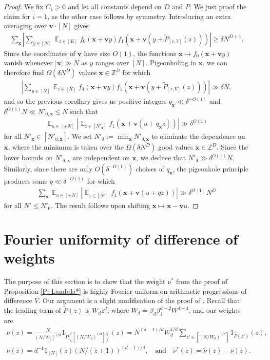 \documentclass[11pt]{amsart}
\theoremstyle{definition}
\DeclareMathOperator*{\E}{\mathbb{E}}
\newcommand{\Z}{{\mathbb Z}}
\newcommand{\bv}{{\textbf{v}}}
\newcommand{\bx}{{\textbf{x}}}
\newcommand{\abs}[1]{\mathopen{}\left| #1\mathclose{}\right|}
\begin{document}
\begin{proof} We fix $C_1>0$ and let all constants depend on $D$ and $P$. We just proof the claim for $i=1$, as the other case follows by symmetry.
    Introducing an extra averaging over $\bv\cdot[N]$ gives
    \begin{align*}
        \sum_\bx\abs{\sum_{y\in[N]} \E_{z\in[K]}f_0(\bx+\bv y) f_1(\bx+\bv(y+ \widetilde{P}_{[r, V]}(z)))}\geq \delta N^{D+1}.
    \end{align*}    
    Since the coordinates of $\bv$ have size $O(1)$, the functions $\bx\mapsto f_0(\bx + \bv y)$ vanish whenever $|\bx|\gg N$ as $y$ ranges over $[N]$. Pigeonholing in $\bx$, we can therefore find $\Omega(\delta N^D)$ values $\bx\in\Z^D$ for which
    \begin{align}\label{E: pigeonholing in bx}
        \abs{\sum_{y\in[N]} \E_{z\in[K]}f_0(\bx+\bv y) f_1(\bx+\bv(y+ \widetilde{P}_{[r, V]}(z)))}\gg \delta N,
    \end{align}
    and so the previous corollary gives us positive integers $q_\bx\ll\delta^{-O(1)}$ and $\delta^{O(1)}N\ll N'_{0,\bx}\leq N$
    such that 
    \begin{align*}
        \E_{u\in [\pm N]}\abs{\E_{z\in[N'_\bx]} f_1(\bx + \bv(u+ q_\bx z))}\gg \delta^{O(1)}
    \end{align*}
    for all $N'_\bx\in[N'_{0,\bx}]$. We set $N'_0 := \min_\bx N'_{0,\bx}$ to eliminate the dependence on $\bx$, where the minimum is taken over the  $\Omega(\delta N^D)$ good values $\bx\in\Z^D$. Since the lower bounds on $N'_{0,\bx}$ are independent on $\bx$, we deduce that $N'_0\gg \delta^{O(1)}N$.
    Similarly, since there are only $O(\delta^{-O(1)})$ choices of $q_\bx$, the pigeonhole principle produces some $q\ll \delta^{-O(1)}$ for which
    \begin{align*}
        \sum_\bx\E_{u\in [\pm N]}\abs{\E_{z\in[N']} f_1(\bx + \bv(u+ q z))}\gg \delta^{O(1)}N^{D}
    \end{align*}
    for all $N' \leq N'_0$.  The result follows upon shifting $\bx \mapsto \bx - \bv u$.
\end{proof}



\section{Fourier uniformity of difference of weights}\label{A: Fourier uniformity}
The purpose of this section is to show that the weight $\nu^*$ from the proof of Proposition \ref{P: Lambda*} is highly Fourier-uniform on arithmetic progressions of difference $V$.  Our argument is a slight modification of the proof of \cite[Lemma B.8]{PSS23}.  Recall that the leading term of $\widetilde P(z)$ is $W_d z^d$, where $W_d=\beta_d \beta_1^{d-2} W^{d-1}$, and our weights are
\begin{gather*}
    \tilde{\nu}(z)= \frac{N}{(N/W_d)^{1/d}}1_{\widetilde P([(N/W_d)^{1/d}])}(z) = N^{(d-1)/d}W_d^{1/d} \sum_{z' \in [(N/W_d)^{1/d}]}1_{\widetilde P(z')}(z),\\
 \nu(z)=d^{-1} 1_{[N]}(z) (N/(z+1))^{(d-1)/d}, \quad \text{and} \quad  \nu^*(z) = \tilde{\nu}(z) - \nu(z).
\end{gather*}
\end{document}
